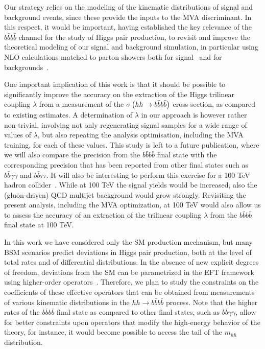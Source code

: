 Our strategy relies on the modeling of the kinematic
distributions of signal and background events, since these provide
the inputs to the MVA discriminant.
%
In this respect, it would be important, having established the key
relevance of the $b\bar{b}b\bar{b}$ channel for the study of
Higgs pair production, to revisit and improve the
theoretical modeling of our signal and background simulation,
in particular using NLO calculations matched to
parton showers both for signal~\cite{Frederix:2014hta,Maierhofer:2013sha}
and for backgrounds~\cite{Alwall:2014hca,Gleisberg:2008ta}.
%


One important implication of this work is that it should
be possible to significantly
improve  the accuracy on the extraction of
the Higgs trilinear coupling $\lambda$ from
a measurement of the
$\sigma\left( hh\to b\bar{b}b\bar{b}\right)$ cross-section, as compared
to existing estimates.
%
A determination of $\lambda$ in our approach is however
rather
non-trivial, involving
 not only regenerating signal samples
 for a wide range of values of  $\lambda$, but also
 repeating the analysis
optimisation, including the MVA training, for each
of these values.
%
This study is left to a future
publication, where we will also
compare the precision from the $b\bar{b}b\bar{b}$ final state
with the corresponding  precision 
that has been reported from other final states such as
 $b\bar{b}\gamma\gamma$
and $b\bar{b}\tau\tau$.
%
It will also be  interesting to perform
this exercise for a 100 TeV hadron collider~\cite{Barr:2014sga,
  Azatov:2015oxa,Papaefstathiou:2015iba,
  Arkani-Hamed:2015vfh}.
%
While at 100 TeV the
signal yields would be increased, also the (gluon-driven) QCD
multijet background would grow strongly.
%
Revisiting
the present analysis, including the MVA optimization,
at 100 TeV would also allow us
to assess the accuracy of an extraction of the trilinear
coupling $\lambda$ from the $b\bar{b}b\bar{b}$ final state
at 100 TeV.

In this work we have considered only the SM production mechanism,
but many BSM scenarios predict deviations
in Higgs pair production, both at the level of total rates
and of
differential distributions.
%
In the absence of new explicit degrees of freedom,
deviations from the SM can be parametrized in
the EFT framework using higher-order
operators~\cite{Azatov:2015oxa,Goertz:2014qta}.
%
Therefore, we plan to study the constraints
on the coefficients of these effective
operators that can be obtained from measurements
of various kinematic distributions
in the $hh\to b\bar{b}b\bar{b}$ process.
%
Note that the higher rates of the $b\bar{b}b\bar{b}$ final state as compared to
other final states, such as
$b\bar{b}\gamma\gamma$, allow for better constraints upon operators
that modify the high-energy behavior
of the theory, for instance,
it would become possible
to access the tail of the $m_{hh}$ distribution.


